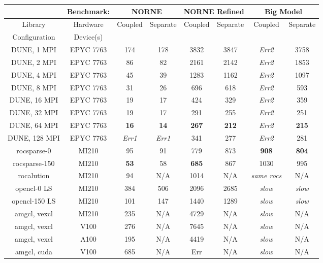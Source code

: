 \begin{table}[!h]
\centering
\begin{tabular}{c|c|c|c|c|c|c|c}
& Benchmark: & \multicolumn{2}{|c|}{NORNE} &\multicolumn{2}{|c|}{NORNE Refined} & \multicolumn{2}{|c}{Big Model} \\\hline
Library & Hardware & \multirow{2}{*}{Coupled} & \multirow{2}{*}{Separate} & \multirow{2}{*}{Coupled} & \multirow{2}{*}{Separate} & \multirow{2}{*}{Coupled} & \multirow{2}{*}{Separate} \\ 
Configuration & Device(s) & & & & & & \\\hline\hline
DUNE,   1 MPI & EPYC 7763 & 174 & 178 & 3832 & 3847 & \textit{Err2} & 3758\\
DUNE,   2 MPI & EPYC 7763 &  86 &  82 & 2161 & 2142 & \textit{Err2} & 1853\\
DUNE,   4 MPI & EPYC 7763 &  45 &  39 & 1283 & 1162 & \textit{Err2} & 1097\\
DUNE,   8 MPI & EPYC 7763 &  31 &  26 &  696 &  618 & \textit{Err2} & 593\\
DUNE,  16 MPI & EPYC 7763 &  19 &  17 &  424 &  329 & \textit{Err2} & 359\\
DUNE,  32 MPI & EPYC 7763 &  19 &  17 &  291 &  255 & \textit{Err2} & 251\\
DUNE,  64 MPI & EPYC 7763 & \textbf{16} & \textbf{14} & \textbf{267} & \textbf{212} & \textit{Err2} & \textbf{215}\\
DUNE, 128 MPI & EPYC 7763 & \textit{Err1} & \textit{Err1} & 341 & 277 & \textit{Err2} & 281\\
rocsparse-0   & MI210 &  95 & 91 & 779 & 873 & \textbf{908} & \textbf{804}\\
rocsparse-150 & MI210 &  \textbf{53} & 58 & \textbf{685} & 867 & 1030 & 995 \\
rocalution    & MI210 &  94 & N/A & 1014 & N/A & \textit{same rocs} & N/A\\
opencl-0 LS   & MI210 & 384 & 506 & 2096 & 2685 & \textit{slow}& \textit{slow}\\
opencl-150 LS & MI210 & 101 & 147 & 1440 & 1289 & \textit{slow}& \textit{slow}\\
amgcl, vexcl & MI210 & 235 & N/A & 4729 & N/A & \textit{slow} & N/A \\
amgcl, vexcl & V100 & 276 & N/A & 7645 & N/A & \textit{slow} & N/A \\
amgcl, vexcl & A100 & 195 & N/A & 4419 & N/A & \textit{slow} & N/A \\
amgcl, cuda  & V100 & 685 & N/A & Err & N/A & \textit{slow} & N/A \\

\end{tabular}
\end{table}
